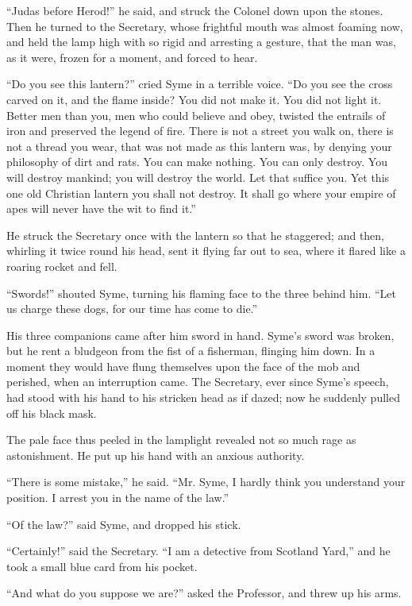 “Judas before Herod!” he said, and struck the Colonel down upon the stones. Then he turned to the Secretary, whose frightful mouth was almost foaming now, and held the lamp high with so rigid and arresting a gesture, that the man was, as it were, frozen for a moment, and forced to hear.

“Do you see this lantern?” cried Syme in a terrible voice. “Do you see the cross carved on it, and the flame inside? You did not make it. You did not light it. Better men than you, men who could believe and obey, twisted the entrails of iron and preserved the legend of fire. There is not a street you walk on, there is not a thread you wear, that was not made as this lantern was, by denying your philosophy of dirt and rats. You can make nothing. You can only destroy. You will destroy mankind; you will destroy the world. Let that suffice you. Yet this one old Christian lantern you shall not destroy. It shall go where your empire of apes will never have the wit to find it.”

He struck the Secretary once with the lantern so that he staggered; and then, whirling it twice round his head, sent it flying far out to sea, where it flared like a roaring rocket and fell.

“Swords!” shouted Syme, turning his flaming face to the three behind him. “Let us charge these dogs, for our time has come to die.”

His three companions came after him sword in hand. Syme’s sword was broken, but he rent a bludgeon from the fist of a fisherman, flinging him down. In a moment they would have flung themselves upon the face of the mob and perished, when an interruption came. The Secretary, ever since Syme’s speech, had stood with his hand to his stricken head as if dazed; now he suddenly pulled off his black mask.

The pale face thus peeled in the lamplight revealed not so much rage as astonishment. He put up his hand with an anxious authority.

“There is some mistake,” he said. “Mr. Syme, I hardly think you understand your position. I arrest you in the name of the law.”

“Of the law?” said Syme, and dropped his stick.

“Certainly!” said the Secretary. “I am a detective from Scotland Yard,” and he took a small blue card from his pocket.

“And what do you suppose we are?” asked the Professor, and threw up his arms.

